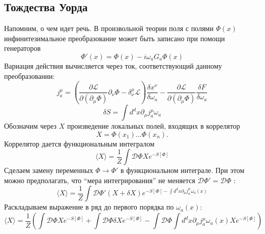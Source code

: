 \documentclass[a4paper,12pt]{article}
\theoremstyle{definition}
\theoremstyle{definition}
\theoremstyle{definition}
\begin{document}
\subsection{Тождества Уорда}
\label{sec:ward-identities}

Напомним, о чем идет речь. В произвольной теории поля с полями $\Phi(x)$ инфинитезимальное
преобразование может быть записано при помощи генераторов 
\begin{equation}
  \label{eq:198}
  \Phi'(x)=\Phi(x)-i\omega_{a} G_{a} \Phi(x)
\end{equation}
Вариация действия вычисляется через ток, соответствующий данному преобразовании:
\begin{equation}
  \label{eq:199}
  j^{\mu}_{a}=\left(\frac{\partial \mathcal{L} }{\partial (\partial_{\mu}\Phi)} \partial_{\nu}\Phi -\delta^{\mu}_{\nu}\mathcal{L}\right) \frac{\delta x^{\nu}}{\delta \omega_{a}} - \frac{\partial \mathcal{L} }{\partial (\partial_{\mu} \Phi)}\frac{\delta F}{\delta \omega_{a}}
\end{equation}
\begin{equation}
  \label{eq:200}
  \delta S =\int d^{d}x \partial_{\mu}j^{\mu}_{a} \omega_{a}
\end{equation}
Обозначим через $X$ произведение локальных полей, входящих в коррелятор
\begin{equation}
  \label{eq:201}
  X=\Phi(x_{1})\dots \Phi(x_{n}).
\end{equation}
Коррелятор дается функциональным интегралом
\begin{equation}
  \label{eq:202}
  \langle X\rangle = \frac{1}{Z}\int \mathcal{D} \Phi X e^{-S[\Phi]}
\end{equation}
Сделаем замену переменных $\Phi\to \Phi'$ в функциональном интеграле. При этом можно предполагать,
что ``мера интегрирования'' не меняется $\mathcal{D}\Phi'=\mathcal{D}\Phi$
\cite{difrancesco1997cft}: 
\begin{equation}
  \label{eq:203}
  \langle X\rangle = \frac{1}{Z} \int \mathcal{D} \Phi' (X+\delta X)e^{-S[\Phi]-\int d^{d}x \partial_{\mu}j^{\mu}_{a}\omega_{a}(x)}
\end{equation}
Раскладываем выражение в ряд до первого порядка по $\omega_{a}(x)$:
\begin{equation}
  \label{eq:204}
  \langle X\rangle=\frac{1}{Z} \left( \int \mathcal{D} \Phi X e^{-S[\Phi]}+\int \mathcal{D} \Phi \delta X e^{-S[\Phi]} -\int \mathcal{D}\Phi \int d^{d}x \partial_{\mu}j^{\mu}_{a}\omega_{a}(x) X e^{-S[\Phi]}\right)
\end{equation}
\end{document}
